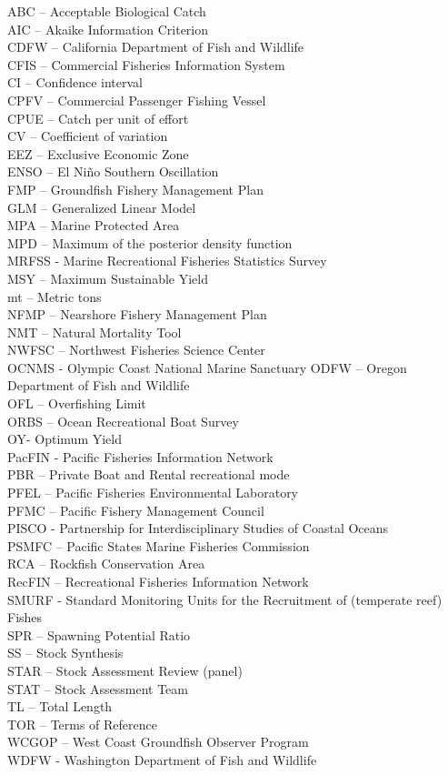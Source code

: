 \documentclass[11pt,
  letterpaper,
]{article}
\begin{document}
ABC -- Acceptable Biological Catch\\
AIC -- Akaike Information Criterion\\
CDFW -- California Department of Fish and Wildlife\\
CFIS -- Commercial Fisheries Information System\\
CI -- Confidence interval\\
CPFV -- Commercial Passenger Fishing Vessel\\
CPUE -- Catch per unit of effort\\
CV -- Coefficient of variation\\
EEZ -- Exclusive Economic Zone\\
ENSO -- El Niño Southern Oscillation\\
FMP -- Groundfish Fishery Management Plan\\
GLM -- Generalized Linear Model\\
MPA -- Marine Protected Area\\
MPD -- Maximum of the posterior density function\\
MRFSS - Marine Recreational Fisheries Statistics Survey\\
MSY -- Maximum Sustainable Yield\\
mt -- Metric tons\\
NFMP -- Nearshore Fishery Management Plan\\
NMT -- Natural Mortality Tool\\
NWFSC -- Northwest Fisheries Science Center\\
OCNMS - Olympic Coast National Marine Sanctuary ODFW -- Oregon Department of Fish and Wildlife\\
OFL -- Overfishing Limit\\
ORBS -- Ocean Recreational Boat Survey\\
OY- Optimum Yield\\
PacFIN - Pacific Fisheries Information Network\\
PBR -- Private Boat and Rental recreational mode\\
PFEL -- Pacific Fisheries Environmental Laboratory\\
PFMC -- Pacific Fishery Management Council\\
PISCO - Partnership for Interdisciplinary Studies of Coastal Oceans\\
PSMFC -- Pacific States Marine Fisheries Commission\\
RCA -- Rockfish Conservation Area\\
RecFIN -- Recreational Fisheries Information Network\\
SMURF - Standard Monitoring Units for the Recruitment of (temperate reef) Fishes\\
SPR -- Spawning Potential Ratio\\
SS -- Stock Synthesis\\
STAR -- Stock Assessment Review (panel)\\
STAT -- Stock Assessment Team\\
TL -- Total Length\\
TOR -- Terms of Reference\\
WCGOP -- West Coast Groundfish Observer Program\\
WDFW - Washington Department of Fish and Wildlife
\end{document}
